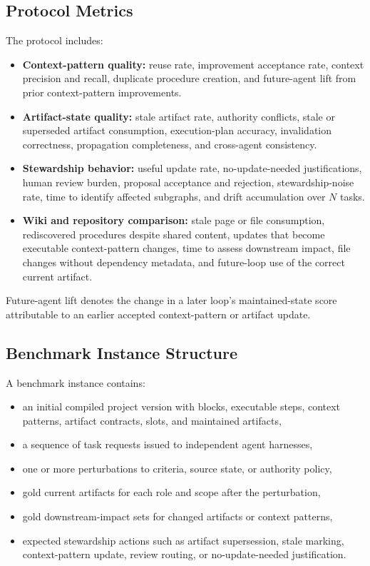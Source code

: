 \documentclass{article}
\begin{document}
\subsection{Protocol Metrics}

The protocol includes:
\begin{itemize}[leftmargin=*]
\item \textbf{Context-pattern quality:} reuse rate, improvement acceptance rate, context precision and recall, duplicate procedure creation, and future-agent lift from prior context-pattern improvements.
\item \textbf{Artifact-state quality:} stale artifact rate, authority conflicts, stale or superseded artifact consumption, execution-plan accuracy, invalidation correctness, propagation completeness, and cross-agent consistency.
\item \textbf{Stewardship behavior:} useful update rate, no-update-needed justifications, human review burden, proposal acceptance and rejection, stewardship-noise rate, time to identify affected subgraphs, and drift accumulation over $N$ tasks.
\item \textbf{Wiki and repository comparison:} stale page or file consumption, rediscovered procedures despite shared content, updates that become executable context-pattern changes, time to assess downstream impact, file changes without dependency metadata, and future-loop use of the correct current artifact.
\end{itemize}
Future-agent lift denotes the change in a later loop's maintained-state score attributable to an earlier accepted context-pattern or artifact update.

\subsection{Benchmark Instance Structure}

A benchmark instance contains:
\begin{itemize}[leftmargin=*]
\item an initial compiled project version with blocks, executable steps, context patterns, artifact contracts, slots, and maintained artifacts,
\item a sequence of task requests issued to independent agent harnesses,
\item one or more perturbations to criteria, source state, or authority policy,
\item gold current artifacts for each role and scope after the perturbation,
\item gold downstream-impact sets for changed artifacts or context patterns,
\item expected stewardship actions such as artifact supersession, stale marking, context-pattern update, review routing, or no-update-needed justification.
\end{itemize}
\end{document}
